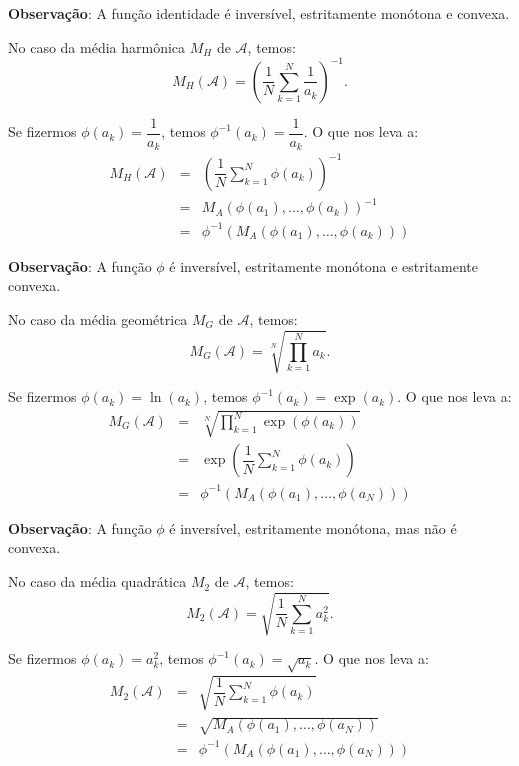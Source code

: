 {\textbf{Observação}: A função identidade é inversível, estritamente monótona e convexa.

No caso da média harmônica \(M_H\) de \(\mathcal{A}\), temos:
\[
M_H(\mathcal{A})
=  \left(\dfrac{1}{N} \displaystyle\sum_{k=1}^{N} \dfrac{1}{a_{k}}\right)^{-1}.
\]

Se fizermos \(\phi(a_k) = \dfrac{1}{a_k}\), temos \(\phi^{-1}(a_k) = \dfrac{1}{a_k}\). O que nos leva a:
\[\begin{array}{rcl}
M_H(\mathcal{A})
&=& \left(\dfrac{1}{N} \displaystyle\sum_{k=1}^{N} \phi(a_{k})\right)^{-1} \\
&=& M_A\left(\phi(a_1), \ldots, \phi(a_k)\right)^{-1} \\
&=& \phi^{-1}\left(M_A(\phi(a_1), \ldots, \phi(a_k))\right)
\end{array}\]

\textbf{Observação}: A função \(\phi\) é inversível, estritamente monótona e estritamente convexa.




No caso da média geométrica \(M_G\) de \(\mathcal{A}\), temos:
\[
M_G(\mathcal{A})
= \displaystyle\sqrt[N]{\prod_{k=1}^{N} a_{k}}.
\]

Se fizermos \(\phi(a_k) = \ln(a_k)\), temos \(\phi^{-1}(a_k) = \exp(a_k)\). O que nos leva a:
\[\begin{array}{rcl}
M_G(\mathcal{A})
&=& \displaystyle \sqrt[N]{\prod_{k=1}^{N} \exp(\phi(a_{k}))} \\
&=& \displaystyle \exp\left(\dfrac{1}{N} \sum_{k=1}^{N} \phi(a_k)\right) \\
&=& \phi^{-1}(M_A(\phi(a_1), \ldots, \phi(a_N)))
\end{array}\]

\textbf{Observação}: A função \(\phi\) é inversível, estritamente monótona, mas não é convexa.


No caso da média quadrática \(M_2\) de \(\mathcal{A}\), temos:
\[
M_2(\mathcal{A})
= \displaystyle \sqrt{\dfrac{1}{N}\sum_{k=1}^{N} a_{k}^2}.
\]

Se fizermos \(\phi(a_k) = a_k^2\), temos \(\phi^{-1}(a_k) = \sqrt{a_k}\). O que nos leva a:
\[\begin{array}{rcl}
M_2(\mathcal{A})
&=& \displaystyle \sqrt{\dfrac{1}{N}\sum_{k=1}^{N} \phi(a_{k})} \\
&=& \displaystyle \sqrt{M_A(\phi(a_1), \ldots, \phi(a_N))} \\
&=& \phi^{-1}(M_A(\phi(a_1), \ldots, \phi(a_N)))
\end{array}\]

}
